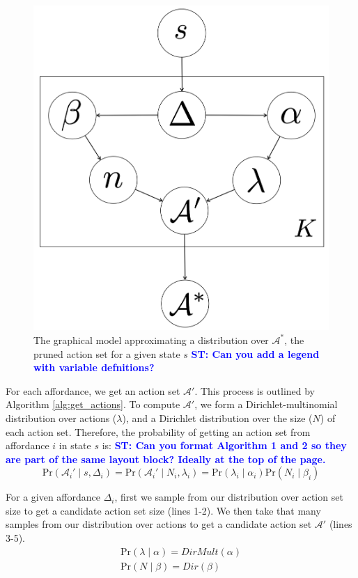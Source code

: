 \documentclass[conference]{IEEEtran}
\newcommand{\stnote}[1]{\textcolor{Blue}{\textbf{ST: #1}}}
\begin{document}
\begin{figure}
\centering
\includegraphics[scale=0.14]{figures/learn_graphical_model.png}%
  \caption{The graphical model approximating a distribution over $\mathcal{A}^*$, the pruned action set for a given state $s$ \stnote{Can you add a legend with variable defnitions?}}
  \label{fig:graphical_model}
\end{figure}

For each affordance, we get an action set $\mathcal{A}'$. This 
process is outlined by Algorithm \ref{alg:get_actions}. To compute $\mathcal{A}'$, we form a Dirichlet-multinomial distribution
over actions ($\lambda$), and a Dirichlet distribution over the size ($N$) of each action set. Therefore, the probability of getting an action set from affordance $i$ in state $s$ is: \stnote{Can you format Algorithm 1 and 2 so they are part of the same layout block?  Ideally at the top of the page.}
\begin{equation}
\text{Pr}(\mathcal{A}_i' \mid s,\Delta_i) = \text{Pr}(\mathcal{A}_i' \mid N_i, \lambda_i) = \text{Pr}(\lambda_i \mid \alpha_i) \text{Pr}(N_i \mid \beta_i)
\end{equation}

For a given affordance $\Delta_i$, first we sample from our distribution over action set size to get a candidate action set size (lines 1-2). We then
take that many samples from our distribution over actions to get a candidate action set $\mathcal{A}'$ (lines 3-5).
\begin{align}
\text{Pr}(\lambda \mid \alpha) = DirMult(\alpha) \\
\text{Pr}(N \mid \beta) = Dir(\beta)
\end{align}
\end{document}
